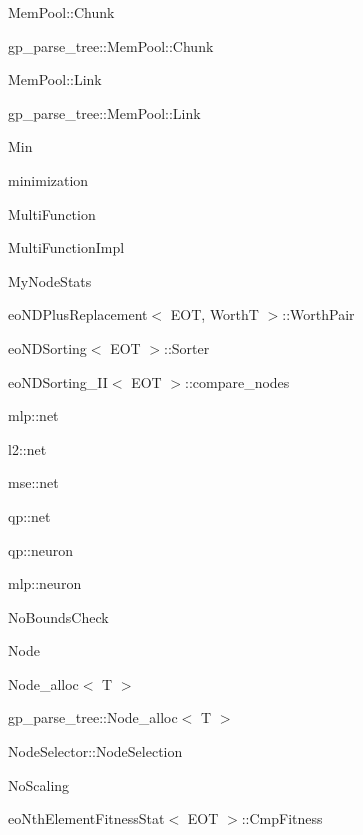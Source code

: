 \begin{CompactList}
\item Mem\-Pool::Chunk\item gp\_\-parse\_\-tree::Mem\-Pool::Chunk\item Mem\-Pool::Link\item gp\_\-parse\_\-tree::Mem\-Pool::Link\item Min\item minimization\item Multi\-Function\item Multi\-Function\-Impl\item My\-Node\-Stats\item eo\-NDPlus\-Replacement$<$ EOT, Worth\-T $>$::Worth\-Pair\item eo\-NDSorting$<$ EOT $>$::Sorter\item eo\-NDSorting\_\-II$<$ EOT $>$::compare\_\-nodes\item {}
\item mlp::net\item l2::net\item mse::net\item qp::net\item qp::neuron\item mlp::neuron\item No\-Bounds\-Check\item Node\item Node\_\-alloc$<$ T $>$\item gp\_\-parse\_\-tree::Node\_\-alloc$<$ T $>$\item {}
\begin{CompactList}
\item {}
\item {}
\end{CompactList}
\item Node\-Selector::Node\-Selection\item {}
\item No\-Scaling\item eo\-Nth\-Element\-Fitness\-Stat$<$ EOT $>$::Cmp\-Fitness\item {}
\begin{CompactList}

\end{CompactList}
\end{CompactList}
